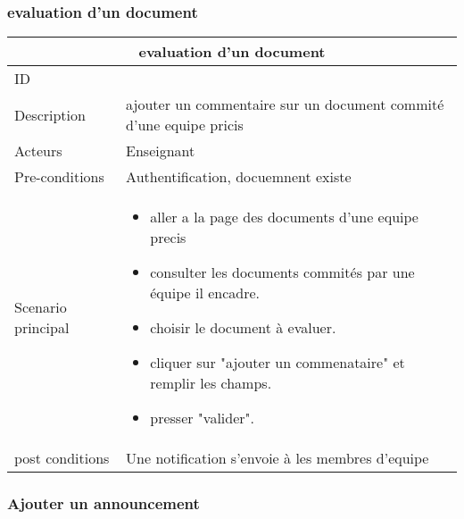 \documentclass[11pt,fleqn]{book} %
\begin{document}
\subsubsection{evaluation d'un document}
\begin{center}
\begin{tabularx}{1\textwidth} { | p{4cm} | >{\raggedright\arraybackslash}X |  }
  \hline
  \multicolumn{2}{|c|}{evaluation  d'un document} \\
 \hline
 ID & 2  \\
 \hline
 Description  &  ajouter un commentaire sur un document commité d'une equipe pricis  \\
  \hline
 Acteurs  & Enseignant  \\
  \hline
 Pre-conditions  & Authentification, docuemnent existe\\
 \hline
 Scenario principal  &  
 \begin{itemize}
     \item aller a la page des documents d'une equipe precis
     \item consulter les documents commités par une équipe il encadre.
      \item choisir le document à evaluer.
      \item cliquer sur "ajouter un commenataire" et remplir les champs.
      \item presser "valider".

 \end{itemize}\\
  \hline
 post conditions  &  Une notification s’envoie à les membres d'equipe  \\
  \hline
\end{tabularx}
\label{tbl:nicetablelesstable}
\end{center}

\subsubsection{Ajouter un announcement}
\end{document}

